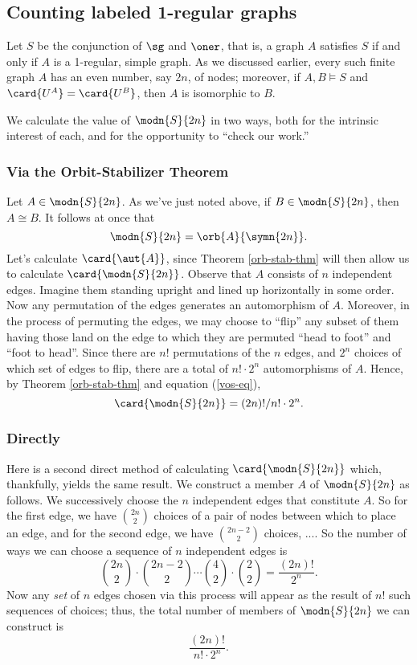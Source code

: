 \subsection{Counting labeled 1-regular graphs}

Let $S$ be the conjunction of $\sg$ and $\oner$, that is, a graph $A$ satisfies $S$ if and only if $A$ is a 1-regular, simple graph. As we discussed earlier, every such finite graph $A$ has an even number, say $2n$, of nodes; moreover, if $A,B\models S$ and $\card{U^A}=\card{U^B}$, then $A$ is isomorphic to $B$. 
\iffalse
\fi
We calculate the value of $\modn{S}{2n}$ in two ways, both for the intrinsic interest of each, and for the opportunity to ``check our work.''
\subsubsection{Via the Orbit-Stabilizer Theorem}

Let $A\in\modn{S}{2n}$. As we've just noted above, if $B\in\modn{S}{2n}$, then $A\cong B$. It follows at once that 
\begin{equation}\label{vos-eq}
\modn{S}{2n}=\orb{A}{\symn{2n}}.
\end{equation}
 Let's calculate $\card{\aut{A}}$, since Theorem \ref{orb-stab-thm} will then allow us to calculate $\card{\modn{S}{2n}}$. Observe that $A$ consists of $n$ independent edges. Imagine them standing upright and lined up horizontally in some order. Now any permutation of the edges generates an automorphism of $A$. Moreover, in the process of permuting the edges, we may choose to ``flip'' any subset of them having those land on the edge to which they are permuted ``head to foot'' and ``foot to head''. Since there are $n!$ permutations of the $n$ edges, and $2^n$ choices of which set of edges to flip, there are a total of $n!\cdot 2^n$ automorphisms of $A$. Hence, by Theorem \ref{orb-stab-thm} and equation (\ref{vos-eq}), 
 \[
 \card{\modn{S}{2n}}= (2n)!/n!\cdot 2^n.
 \]
\subsubsection{Directly}

Here is a second direct method of calculating $\card{\modn{S}{2n}}$ which, thankfully, yields the same result. We construct a member $A$ of $\modn{S}{2n}$ as follows. We successively choose the $n$ independent edges that constitute $A$. So for the first edge, we have $\binom{2n}{2}$ choices of a pair of nodes between which to place an edge, and for the second edge, we have $\binom{2n-2}{2}$ choices, .... So the number of ways we can choose a sequence of $n$ independent edges is
\[
\binom{2n}{2}\cdot\binom{2n-2}{2}\cdots\binom{4}{2}\cdot\binom{2}{2}= \frac{(2n)!}{2^n}.
\]
Now any \emph{set} of $n$ edges chosen via this process will appear as the result of $n!$ such sequences of choices; thus, the total number of members of $\modn{S}{2n}$ we can construct is 
\[
\frac{(2n)!}{n!\cdot 2^n}.
\]
